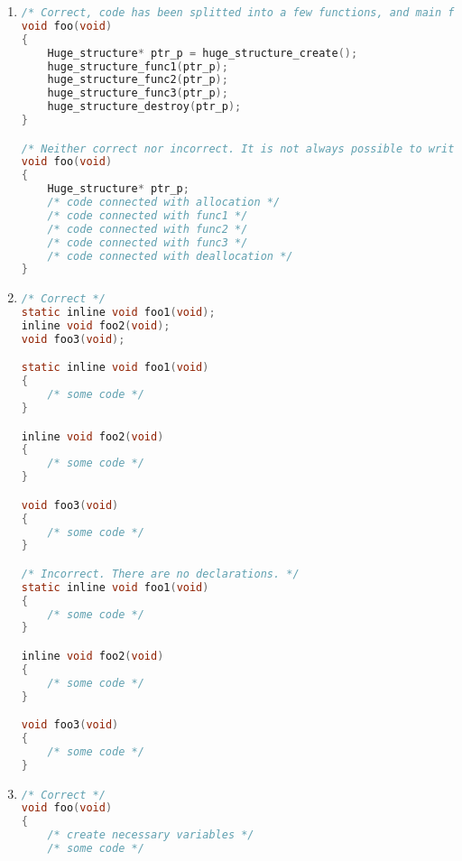 \begin{enumerate}
\begin{lstlisting}[language=C,style=C99]
    return ptr_p;
}

/* Incorrect because returned huge structure by value */
Huge_structure foo(void)
{
    Huge_structure result = {0};
    process(&result);
    
    return result;
}


/* Correct. Pass huge structure to function by pointer */
void* foo(Huge_structure* ptr_p)
{
    /* some code */
}

/* Incorrect */
void* foo(Huge_structure huge_structure)
{
    /* some code */
}
\end{lstlisting}


    \item 
\begin{lstlisting}[language=C,style=C99]
/* Correct, code has been splitted into a few functions, and main function only calls another function */
void foo(void)
{
    Huge_structure* ptr_p = huge_structure_create();
    huge_structure_func1(ptr_p);
    huge_structure_func2(ptr_p);
    huge_structure_func3(ptr_p);
    huge_structure_destroy(ptr_p);
}

/* Neither correct nor incorrect. It is not always possible to write function to 100 lines and 6 arguments. But if possible, design function as good as can */
void foo(void)
{
    Huge_structure* ptr_p;
    /* code connected with allocation */
    /* code connected with func1 */
    /* code connected with func2 */
    /* code connected with func3 */
    /* code connected with deallocation */
}
\end{lstlisting}
    
    \item 
\begin{lstlisting}[language=C,style=C99]
/* Correct */
static inline void foo1(void);
inline void foo2(void);
void foo3(void);

static inline void foo1(void)
{
    /* some code */
}

inline void foo2(void)
{
    /* some code */
}

void foo3(void)
{
    /* some code */
}

/* Incorrect. There are no declarations. */
static inline void foo1(void)
{
    /* some code */
}

inline void foo2(void)
{
    /* some code */
}

void foo3(void)
{
    /* some code */
}
\end{lstlisting} 
    
    \item 
\begin{lstlisting}[language=C,style=C99]
/* Correct */
void foo(void)
{
    /* create necessary variables */
    /* some code */
    

\end{lstlisting}
\end{enumerate}
